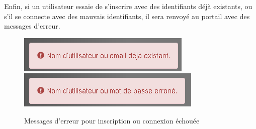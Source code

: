 Enfin, si un utilisateur essaie de s'inscrire avec des identifiants déjà 
existants, ou s'il se connecte avec des mauvais identifiants, il sera renvoyé au 
portail avec des messages d'erreur. \\

\begin{figure}[h!]
	\centering
	\includegraphics{img/trysignup.png}
	\includegraphics{img/trylogin.png}
	\caption{Messages d'erreur pour inscription ou connexion échouée}
\end{figure}

